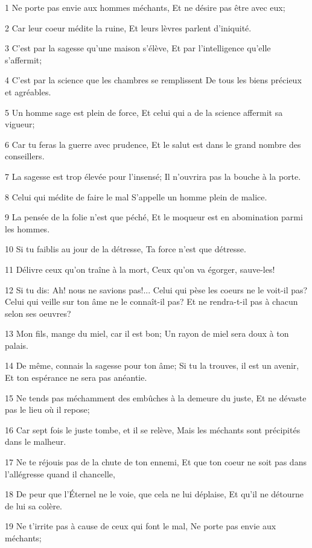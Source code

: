 \par 1 Ne porte pas envie aux hommes méchants, Et ne désire pas être avec eux;
\par 2 Car leur coeur médite la ruine, Et leurs lèvres parlent d'iniquité.
\par 3 C'est par la sagesse qu'une maison s'élève, Et par l'intelligence qu'elle s'affermit;
\par 4 C'est par la science que les chambres se remplissent De tous les biens précieux et agréables.
\par 5 Un homme sage est plein de force, Et celui qui a de la science affermit sa vigueur;
\par 6 Car tu feras la guerre avec prudence, Et le salut est dans le grand nombre des conseillers.
\par 7 La sagesse est trop élevée pour l'insensé; Il n'ouvrira pas la bouche à la porte.
\par 8 Celui qui médite de faire le mal S'appelle un homme plein de malice.
\par 9 La pensée de la folie n'est que péché, Et le moqueur est en abomination parmi les hommes.
\par 10 Si tu faiblis au jour de la détresse, Ta force n'est que détresse.
\par 11 Délivre ceux qu'on traîne à la mort, Ceux qu'on va égorger, sauve-les!
\par 12 Si tu dis: Ah! nous ne savions pas!... Celui qui pèse les coeurs ne le voit-il pas? Celui qui veille sur ton âme ne le connaît-il pas? Et ne rendra-t-il pas à chacun selon ses oeuvres?
\par 13 Mon fils, mange du miel, car il est bon; Un rayon de miel sera doux à ton palais.
\par 14 De même, connais la sagesse pour ton âme; Si tu la trouves, il est un avenir, Et ton espérance ne sera pas anéantie.
\par 15 Ne tends pas méchamment des embûches à la demeure du juste, Et ne dévaste pas le lieu où il repose;
\par 16 Car sept fois le juste tombe, et il se relève, Mais les méchants sont précipités dans le malheur.
\par 17 Ne te réjouis pas de la chute de ton ennemi, Et que ton coeur ne soit pas dans l'allégresse quand il chancelle,
\par 18 De peur que l'Éternel ne le voie, que cela ne lui déplaise, Et qu'il ne détourne de lui sa colère.
\par 19 Ne t'irrite pas à cause de ceux qui font le mal, Ne porte pas envie aux méchants;
